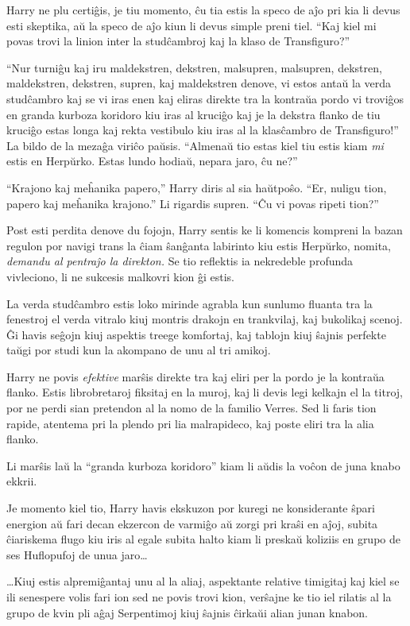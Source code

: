 Harry ne plu certiĝis, je tiu momento, ĉu tia estis la speco de aĵo pri kia li
devus esti skeptika, aŭ la speco de aĵo kiun li devus simple preni tiel. ``Kaj
kiel mi povas trovi la linion inter la studĉambroj kaj la klaso de
Transfiguro?''

``Nur turniĝu kaj iru maldekstren, dekstren, malsupren, malsupren, dekstren,
maldekstren, dekstren, supren, kaj maldekstren denove, vi estos antaŭ la verda
studĉambro kaj se vi iras enen kaj eliras direkte tra la kontraŭa pordo vi
troviĝos en granda kurboza koridoro kiu iras al kruciĝo kaj je la dekstra flanko
de tiu kruciĝo estas longa kaj rekta vestibulo kiu iras al la klasĉambro de
Transfiguro!'' La bildo de la mezaĝa viriĉo paŭsis. ``Almenaŭ tio estas kiel tiu
estis kiam \emph{mi} estis en Herpŭrko. Estas lundo hodiaŭ, nepara jaro, ĉu
ne?''

``Krajono kaj meĥanika papero,'' Harry diris al sia haŭtpoŝo. ``Er,
nuligu tion, papero kaj meĥanika krajono.'' Li rigardis supren. ``Ĉu
vi povas ripeti tion?''

Post esti perdita denove du fojojn, Harry sentis ke li komencis kompreni la bazan
regulon por navigi trans la ĉiam ŝanĝanta labirinto kiu estis Herpŭrko, nomita,
\emph{demandu al pentraĵo la direkton.} Se tio reflektis ia nekredeble profunda
vivleciono, li ne sukcesis malkovri kion ĝi estis.

La verda studĉambro estis loko mirinde agrabla kun sunlumo fluanta tra
la fenestroj el verda vitralo kiuj montris drakojn en trankvilaj, kaj
bukolikaj scenoj. Ĝi havis seĝojn kiuj aspektis treege komfortaj, kaj
tablojn kiuj ŝajnis perfekte taŭgi por studi kun la akompano de unu al
tri amikoj. 

Harry ne povis \emph{efektive} marŝis direkte tra kaj eliri per la
pordo je la kontraŭa flanko. Estis librobretaroj fiksitaj en la muroj,
kaj li devis legi kelkajn el la titroj, por ne perdi sian pretendon al
la nomo de la familio Verres. Sed li faris tion rapide, atentema pri
la plendo pri lia malrapideco, kaj poste eliri tra la alia flanko.

Li marŝis laŭ la ``granda kurboza koridoro'' kiam li aŭdis la voĉon de
juna knabo ekkrii.

Je momento kiel tio, Harry havis ekskuzon por kuregi ne konsiderante
ŝpari energion aŭ fari decan ekzercon de varmiĝo aŭ zorgi pri kraŝi en
aĵoj, subita ĉiariskema flugo kiu iris al egale subita halto kiam li
preskaŭ koliziis en grupo de ses Huflopufoj de unua jaro\ldots

\ldots Kiuj estis alpremiĝantaj unu al la aliaj, aspektante relative
timigitaj kaj kiel se ili senespere volis fari ion sed ne povis trovi
kion, verŝajne ke tio iel rilatis al la grupo de kvin pli aĝaj
Serpentimoj kiuj ŝajnis ĉirkaŭi alian junan knabon.


